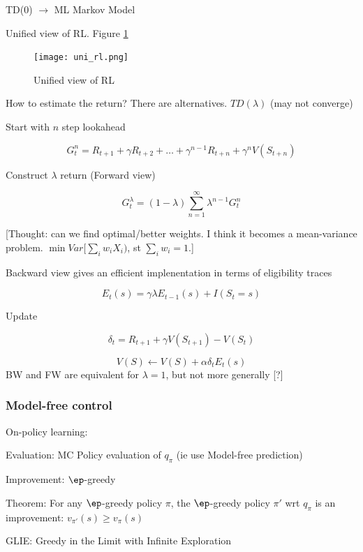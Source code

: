 \documentclass[english]{article}
\begin{document}
TD(0) $\to $ ML Markov Model 

\item Unified view of RL. Figure \ref{Unified view of RL}

    \begin{figure}
        \centering
\texttt{[image: uni\_rl.png]}
\caption{Unified view of RL}
\label{Unified view of RL}
    \end{figure}

\item How to estimate the return? There are alternatives. $TD(\lambda)$ (may not converge)

Start with $n$ step lookahead 

$$G_t^n = R_{t+1}+\gamma R_{t+2} +\ldots + \gamma^{n-1} R_{t+n}
+\gamma^n V(S_{t+n})
$$

Construct $\lambda$ return (Forward view)

$$G_t^\lambda = (1-\lambda) \sum_{n=1}^\infty \lambda^{n-1} G_t^n
$$

[Thought: can we find optimal/better weights. I think it becomes a mean-variance problem. $\min Var[\sum_i w_i X_i)$, st $\sum_i w_i=1$.]

Backward view gives an efficient implenentation in terms of eligibility traces

$$E_t(s) = \gamma \lambda E_{t-1}(s)
+I(S_t=s)
$$

Update

$$\delta_t = R_{t+1}+\gamma V(S_{t+1}) - V(S_{t})
$$

$$V(S) \gets V(S)+\alpha \delta_t E_t(s)$$ 
BW and FW are equivalent for $\lambda=1$, but not more generally [?]



\eenum 


\subsubsection{Model-free control}
\benum

\item On-policy learning: 

Evaluation: MC Policy evaluation of $q_\pi$ (ie use Model-free prediction)

Improvement: $\ep$-greedy

\item Theorem: For any $\ep$-greedy policy $\pi$, the $\ep$-greedy policy $\pi'$ wrt $q_\pi$ is an improvement: $v_{\pi'}(s) \ge v_\pi(s)$

\item GLIE: Greedy in the Limit with Infinite Exploration
\end{document}
